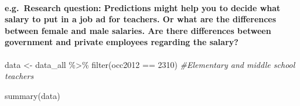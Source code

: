 \documentclass[
]{article}
\newenvironment{Shaded}{\begin{snugshade}}{\end{snugshade}}
\newcommand{\CommentTok}[1]{\textcolor[rgb]{0.56,0.35,0.01}{\textit{#1}}}
\newcommand{\DecValTok}[1]{\textcolor[rgb]{0.00,0.00,0.81}{#1}}
\newcommand{\FunctionTok}[1]{\textcolor[rgb]{0.00,0.00,0.00}{#1}}
\newcommand{\NormalTok}[1]{#1}
\newcommand{\OtherTok}[1]{\textcolor[rgb]{0.56,0.35,0.01}{#1}}
\newcommand{\SpecialCharTok}[1]{\textcolor[rgb]{0.00,0.00,0.00}{#1}}
\begin{document}
\hypertarget{e.g.-research-question-predictions-might-help-you-to-decide-what-salary-to-put-in-a-job-ad-for-teachers.-or-what-are-the-differences-between-female-and-male-salaries.-are-there-differences-between-government-and-private-employees-regarding-the-salary}{%
\paragraph{e.g.~Research question: Predictions might help you to decide
what salary to put in a job ad for teachers. Or what are the differences
between female and male salaries. Are there differences between
government and private employees regarding the
salary?}\label{e.g.-research-question-predictions-might-help-you-to-decide-what-salary-to-put-in-a-job-ad-for-teachers.-or-what-are-the-differences-between-female-and-male-salaries.-are-there-differences-between-government-and-private-employees-regarding-the-salary}}

\begin{Shaded}
\begin{Highlighting}[]
\NormalTok{data }\OtherTok{\textless{}{-}}\NormalTok{ data\_all }\SpecialCharTok{\%\textgreater{}\%} \FunctionTok{filter}\NormalTok{(occ2012 }\SpecialCharTok{==} \DecValTok{2310}\NormalTok{)  }\CommentTok{\#Elementary and middle school teachers}

\FunctionTok{summary}\NormalTok{(data)}
\end{Highlighting}
\end{Shaded}
\end{document}
